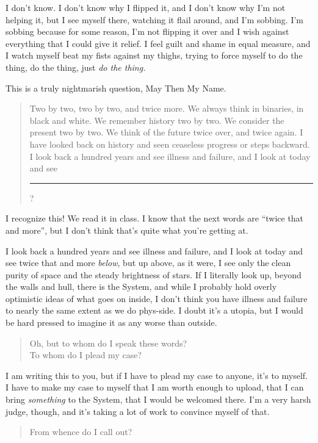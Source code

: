 \noindent I don't know. I don't know why I flipped it, and I don't know why I'm not helping it, but I see myself there, watching it flail around, and I'm sobbing. I'm sobbing because for some reason, I'm not flipping it over and I wish against everything that I could give it relief. I feel guilt and shame in equal measure, and I watch myself beat my fists against my thighs, trying to force myself to do the thing, do the thing, just \emph{do the thing.}

This is a truly nightmarish question, May Then My Name.

\begin{quote}
Two by two, two by two, and twice more. We always think in binaries, in black and white. We remember history two by two. We consider the present two by two. We think of the future twice over, and twice again. I have looked back on history and seen ceaseless progress or steps backward. I look back a hundred years and see illness and failure, and I look at today and see \rule{5em}{0.75pt}?
\end{quote}

\noindent I recognize this! We read it in class. I know that the next words are ``twice that and more'', but I don't think that's quite what you're getting at.

I look back a hundred years and see illness and failure, and I look at today and see twice that and more \emph{below}, but up above, as it were, I see only the clean purity of space and the steady brightness of stars. If I literally look up, beyond the walls and hull, there is the System, and while I probably hold overly optimistic ideas of what goes on inside, I don't think you have illness and failure to nearly the same extent as we do phys-side. I doubt it's a utopia, but I would be hard pressed to imagine it as any worse than outside.

\begin{quote}
Oh, but to whom do I speak these words?\\
To whom do I plead my case?
\end{quote}

\noindent I am writing this to you, but if I have to plead my case to anyone, it's to myself. I have to make my case to myself that I am worth enough to upload, that I can bring \emph{something} to the System, that I would be welcomed there. I'm a very harsh judge, though, and it's taking a lot of work to convince myself of that.

\begin{quote}
From whence do I call out?
\end{quote}

